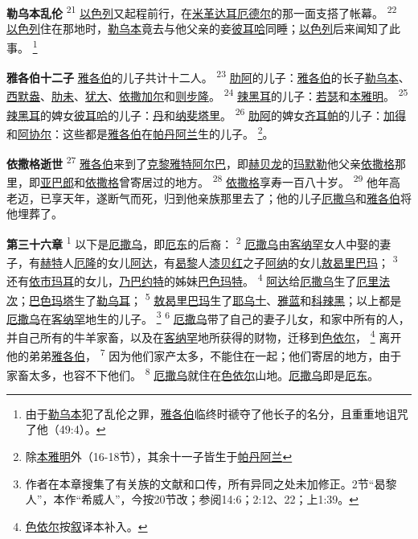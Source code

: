 \textbf{勒乌本乱伦\quad}
\textsuperscript{21}
\uline{以色列}又起程前行，在\uline{米革}\uline{达耳}\uline{厄德尔}的那一面支搭了帐幕。
\textsuperscript{22}
\uline{以色列}住在那地时，\uline{勒乌本}竟去与他父亲的妾\uline{彼耳哈}同睡；\uline{以色列}后来闻知了此事。
\footnote{由于\uline{勒乌本}犯了乱伦之罪，\uline{雅各伯}临终时禠夺了他长子的名分，且重重地诅咒了他（49:4）。}

\textbf{雅各伯十二子\quad}
\uline{雅各伯}的儿子共计十二人。
\textsuperscript{23}
\uline{肋阿}的儿子：\uline{雅各伯}的长子\uline{勒乌本}、\uline{西默盎}、\uline{肋未}、\uline{犹大}、\uline{依撒}\uline{加尔}和\uline{则步隆}。
\textsuperscript{24}
\uline{辣黑耳}的儿子：\uline{若瑟}和\uline{本雅明}。
\textsuperscript{25}
\uline{辣黑耳}的婢女\uline{彼耳哈}的儿子：\uline{丹}和\uline{纳斐塔里}。
\textsuperscript{26}
\uline{肋阿}的婢女\uline{齐耳帕}的儿子：\uline{加得}和\uline{阿协尔}：这些都是\uline{雅各伯}在\uline{帕丹}\uline{阿兰}生的儿子。
\footnote{除\uline{本雅明}外（16-18节），其余十一子皆生于\uline{帕丹}\uline{阿兰}}。

\textbf{依撒格逝世\quad}
\textsuperscript{27}
\uline{雅各伯}来到了\uline{克黎}\uline{雅特}\uline{阿尔巴}，即\uline{赫贝龙}的\uline{玛默勒}他父亲\uline{依撒格}那里，即\uline{亚巴郎}和\uline{依撒格}曾寄居过的地方。
\textsuperscript{28}
\uline{依撒格}享寿一百八十岁。
\textsuperscript{29}
他年高老迈，已享天年，遂断气而死，归到他亲族那里去了；他的儿子\uline{厄撒乌}和\uline{雅各伯}将他埋葬了。

\textbf{第三十六章\quad}
\textsuperscript{1}
以下是\uline{厄撒乌}，即\uline{厄东}的后裔：
\textsuperscript{2}
\uline{厄撒乌}由\uline{客纳罕}女人中娶的妻子，有\uline{赫特}人\uline{厄隆}的女儿\uline{阿达}，有\uline{曷黎}人\uline{漆贝红}之子\uline{阿纳}的女儿\uline{敖曷里}\uline{巴玛}；
\textsuperscript{3}
还有\uline{依市}\uline{玛耳}的女儿，\uline{乃巴}\uline{约特}的姊妹\uline{巴色}\uline{玛特}。
\textsuperscript{4}
\uline{阿达}给\uline{厄撒乌}生了\uline{厄里}\uline{法次}；\uline{巴色}\uline{玛塔}生了\uline{勒乌耳}；
\textsuperscript{5}
\uline{敖曷里}\uline{巴玛}生了\uline{耶乌士}、\uline{雅蓝}和\uline{科辣黑}；以上都是\uline{厄撒乌}在\uline{客纳罕}地生的儿子。
\footnote{作者在本章搜集了有关族的文献和口传，所有异同之处未加修正。2节“曷黎人”，本作“希威人”，今按20节改；参阅14:6；2:12、22；上1:39。}
\textsuperscript{6}
\uline{厄撒乌}带了自己的妻子儿女，和家中所有的人，并自己所有的牛羊家畜，以及在\uline{客纳罕}地所获得的财物，迁移到\uline{色依尔}，
\footnote{\uline{色依尔}按\uline{叙}译本补入。}
离开他的弟弟\uline{雅各伯}，
\textsuperscript{7}
因为他们家产太多，不能住在一起；他们寄居的地方，由于家畜太多，也容不下他们。
\textsuperscript{8}
\uline{厄撒乌}就住在\uline{色依尔}山地。\uline{厄撒乌}即是\uline{厄东}。

